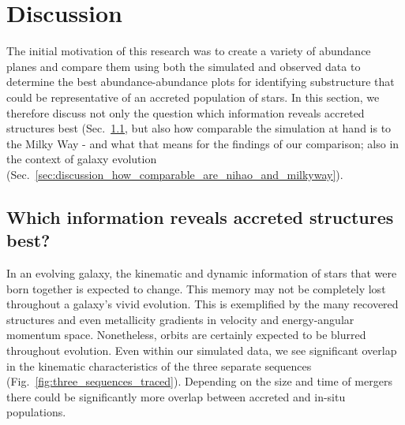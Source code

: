 \documentclass[fleqn,usenatbib]{mnras}
\begin{document}
\section{Discussion} \label{sec:discussion}

The initial motivation of this research was to create a variety of abundance planes and compare them using both the simulated and observed data to determine the best abundance-abundance plots for identifying substructure that could be representative of an accreted population of stars. In this section, we therefore discuss not only the question which information reveals accreted structures best (Sec.~\ref{sec:discussion_best_information}, but also how comparable the simulation at hand is to the Milky Way - and what that means for the findings of our comparison; also in the context of galaxy evolution (Sec.~\ref{sec:discussion_how_comparable_are_nihao_and_milkyway}).

\subsection{Which information reveals accreted structures best?} \label{sec:discussion_best_information}

In an evolving galaxy, the kinematic and dynamic information of stars that were born together is expected to change. This memory may not be completely lost throughout a galaxy's vivid evolution. This is exemplified by the many recovered structures \citep{Deason2024} and even metallicity gradients \citep{Khoperskov2023d} in velocity and energy-angular momentum space. Nonetheless, orbits are certainly expected to be blurred throughout evolution. Even within our simulated data, we see significant overlap in the kinematic characteristics of the three separate sequences (Fig.~\ref{fig:three_sequences_traced}). Depending on the size and time of mergers there could be significantly more overlap between accreted and in-situ populations.
\end{document}
